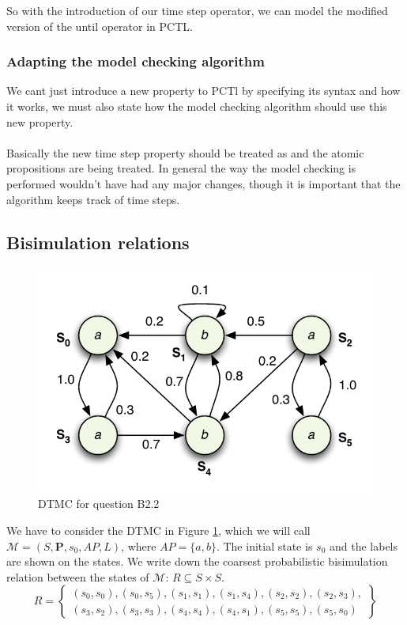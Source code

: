 \documentclass[12pt]{report}
\begin{document}
So with the introduction of our time step operator, we can model the modified version of the until operator in PCTL.

\subsubsection*{Adapting the model checking algorithm}
We cant just introduce a new property to PCTl by specifying its syntax and how it works, we must also state how the model checking algorithm should use this new property.\\
\\
Basically the new time step property should be treated as  and the atomic propositions are being treated. In general the way the model checking is performed wouldn't have had any major changes, though it is important that the algorithm keeps track of time steps.

\subsection*{Bisimulation relations}
\begin{figure}[H]
	\begin{center}
		\includegraphics[scale=.85]{../GFX/ExerciseFigure4.pdf}
	\end{center}
	\caption{DTMC for question B2.2}
	\label{fig:b22}
\end{figure}

We have to consider the DTMC in Figure \ref{fig:b22}, which we will call $\mathcal{M} = \left(S, \mathbf{P}, s_0, AP, L\right)$, where $AP = \{a,b\}$. The initial state is $s_0$ and the labels are shown on the states.
We write down the coarsest probabilistic bisimulation relation between the states of $\mathcal{M}$: $R \subseteq S \times S$.
$$R = \left\{\begin{array}{c}
(s_0, s_0), (s_0,s_5),(s_1,s_1), (s_1,s_4),(s_2,s_2),(s_2,s_3),\\(s_3,s_2),(s_3,s_3),(s_4,s_4),(s_4,s_1),(s_5,s_5),(s_5,s_0)
\end{array}\right\}$$
\end{document}
